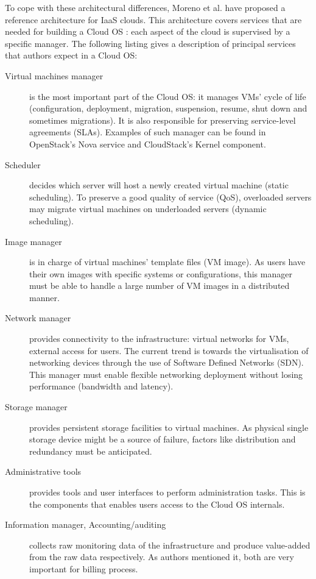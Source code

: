 To cope with these architectural differences, Moreno et al. have proposed a 
reference architecture \cite{moreno2012iaas} for IaaS clouds. This architecture 
covers services that are needed for building a Cloud OS : each aspect of the 
cloud is supervised by a specific manager. The following listing gives a 
description of principal services that authors expect in a Cloud OS:
\begin{description}
	
	\item [Virtual machines manager] is the most important part of the Cloud OS:
	it manages VMs' cycle of life (configuration, deployment, 
	migration, suspension, resume, shut down and sometimes migrations). It is 
	also responsible for preserving service-level agreements (SLAs). Examples of
	such manager can be found in OpenStack's Nova service and CloudStack's 
	Kernel component.

	\item [Scheduler] decides which server will host a newly created virtual 
	machine (static scheduling). To preserve a good quality of service (QoS), 
	overloaded servers may migrate virtual machines on underloaded servers 
	(dynamic scheduling).

	\item [Image manager] is in charge of virtual machines' template files (VM 
	image). As users have their own images with specific systems or 
	configurations, this manager must be able to handle a large number of VM
	images in a distributed manner.

	\item [Network manager] provides connectivity to the infrastructure: virtual
	networks for VMs, external access for users. The current trend is towards 
	the	virtualisation of networking devices through the use of Software
	Defined Networks (SDN). This manager must enable flexible networking 
	deployment without losing performance (bandwidth and latency).

	\item [Storage manager] provides persistent storage facilities to virtual 
	machines. As physical single storage device might be a source of failure,
	factors like distribution and redundancy must be anticipated.

	\item [Administrative tools] provides tools and user interfaces to perform
	administration tasks. This is the components that enables users access to
	the Cloud OS internals.

	\item [Information manager, Accounting/auditing ] collects raw monitoring 
	data of the infrastructure and produce value-added from the raw data 
	respectively. As authors mentioned it, both are very important for billing
	process.

\end{description}

